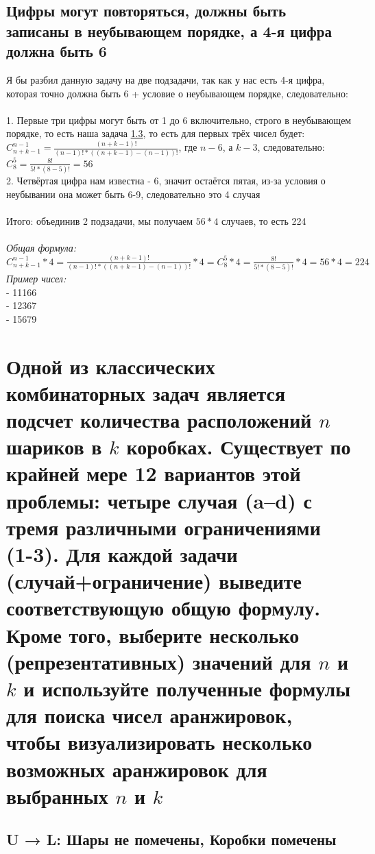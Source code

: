 \documentclass{article}
\begin{document}
        \subsection{Цифры могут повторяться, должны быть записаны в неубывающем порядке, а 4-я цифра должна быть 6}
            Я бы разбил данную задачу на две подзадачи, так как у нас есть 4-я цифра, которая точно должна быть 6 + условие о неубывающем порядке, следовательно:\\\\
            1. Первые три цифры могут быть от 1 до 6 включительно, строго в неубывающем порядке, то есть наша задача \hyperlink{1c}{1.3}, то есть для первых трёх чисел будет:\\
            $ C^{n-1}_{n+k-1} = \frac{(n+k-1)!}{(n-1)!*((n+k-1)-(n-1))!} $, где $ n - 6 $, а $ k - 3 $, следовательно:\\
            $ C^{5}_{8} = \frac{8!}{5!*(8-5)!} = 56 $\\
            2. Четвёртая цифра нам известна - 6, значит остаётся пятая, из-за условия о неубывании она может быть 6-9, следовательно это 4 случая\\\\
            Итого: объединив 2 подзадачи, мы получаем $ 56*4 $ случаев, то есть 224\\\\
            \textit{Общая формула:} $ C^{n-1}_{n+k-1} * 4 = \frac{(n+k-1)!}{(n-1)!*((n+k-1)-(n-1))!} * 4 = C^{5}_{8} * 4 = \frac{8!}{5!*(8-5)!} * 4 = 56 * 4 = 224 $\\
            \textit{Пример чисел:}\\
            - 11166\\
            - 12367\\
            - 15679
    \newpage
    \section{Одной из классических комбинаторных задач является подсчет количества расположений $n$ шариков в $k$ коробках. Существует по крайней мере 12 вариантов этой проблемы: четыре случая (a–d) с тремя различными ограничениями (1-3). Для каждой задачи (случай+ограничение) выведите соответствующую общую формулу. Кроме того, выберите несколько (репрезентативных) значений для $n$ и $k$ и используйте полученные формулы для поиска чисел аранжировок, чтобы визуализировать несколько возможных аранжировок для выбранных $n$ и $k$}
        \subsection{U → L: Шары не помечены, Коробки помечены}
\end{document}
